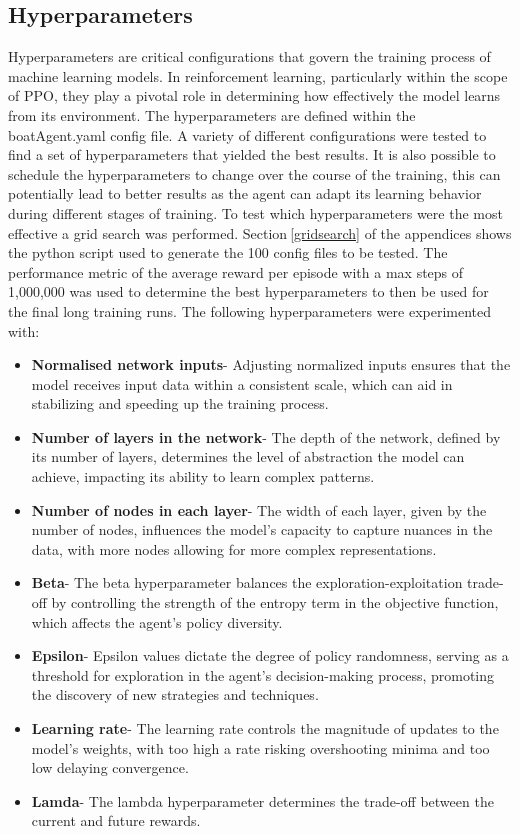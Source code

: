 \subsection{Hyperparameters}\label{sec:hyperparameters}
Hyperparameters are critical configurations that govern the training process of machine learning models. In reinforcement learning, particularly within the scope of PPO, they play a pivotal role in determining how effectively the model learns from its environment. The hyperparameters are defined within the boatAgent.yaml config file. A variety of different configurations were tested to find a set of hyperparameters that yielded the best results. It is also possible to schedule the hyperparameters to change over the course of the training, this can potentially lead to better results as the agent can adapt its learning behavior during different stages of training. To test which hyperparameters were the most effective a grid search was performed. Section$~$\ref{gridsearch} of the appendices shows the python script used to generate the 100 config files to be tested. The performance metric of the average reward per episode with a max steps of 1,000,000 was used to determine the best hyperparameters to then be used for the final long training runs. The following hyperparameters were experimented with:
\begin{itemize}
    \item \textbf{Normalised network inputs}- Adjusting normalized inputs ensures that the model receives input data within a consistent scale, which can aid in stabilizing and speeding up the training process.
    \item \textbf{Number of layers in the network}- The depth of the network, defined by its number of layers, determines the level of abstraction the model can achieve, impacting its ability to learn complex patterns.
    \item \textbf{Number of nodes in each layer}- The width of each layer, given by the number of nodes, influences the model's capacity to capture nuances in the data, with more nodes allowing for more complex representations.
    \item \textbf{Beta}- The beta hyperparameter balances the exploration-exploitation trade-off by controlling the strength of the entropy term in the objective function, which affects the agent's policy diversity.
    \item \textbf{Epsilon}- Epsilon values dictate the degree of policy randomness, serving as a threshold for exploration in the agent's decision-making process, promoting the discovery of new strategies and techniques.
    \item \textbf{Learning rate}- The learning rate controls the magnitude of updates to the model's weights, with too high a rate risking overshooting minima and too low delaying convergence.
    \item \textbf{Lamda}- The lambda hyperparameter determines the trade-off between the current and future rewards.
\end{itemize}
